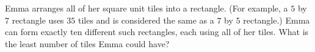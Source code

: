 Emma arranges all of her square unit tiles into a rectangle. (For example, a $5$ by $7$ rectangle uses $35$ tiles and is considered the same as a $7$ by $5$ rectangle.) Emma can form exactly ten different such rectangles, each using all of her tiles. What is the least number of tiles Emma could have?

